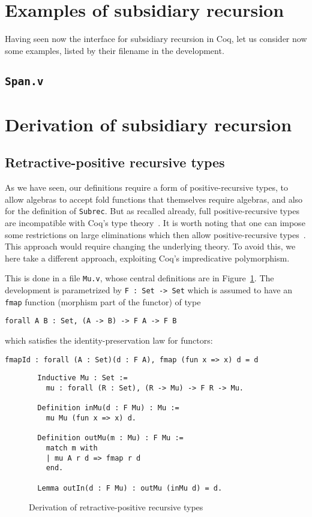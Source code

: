\documentclass[a4paper,USenglish]{lipics-v2021}
\begin{document}
\section{Examples of subsidiary recursion}
\label{sec:examples}

Having seen now the interface for subsidiary recursion in Coq, let us
consider now some examples, listed by their filename in the development.

\subsection{\texttt{Span.v}}



\section{Derivation of subsidiary recursion}
\label{sec:deriv}

\subsection{Retractive-positive recursive types}
\label{sec:mu}

As we have seen, our definitions require a form of positive-recursive
types, to allow algebras to accept fold functions that themselves
require algebras, and also for the definition of \verb|Subrec|.  But
as recalled already, full positive-recursive types are incompatible
with Coq's type theory~\cite{coquand88}.  It is worth noting that one
can impose some restrictions on large eliminations which then allow
positive-recursive types~\cite{blanqui05}.  This approach would
require changing the underlying theory.  To avoid this, we here take a
different approach, exploiting Coq's impredicative polymorphism.

This is done in a file \verb|Mu.v|, whose central definitions are in
Figure~\ref{fig:mu}.  The development is parametrized by
\verb|F : Set -> Set| which is assumed to have an \verb|fmap| function
(morphism part of the functor) of type
\begin{verbatim}
forall A B : Set, (A -> B) -> F A -> F B
\end{verbatim}
\noindent which satisfies the identity-preservation law for functors:
\begin{verbatim}
fmapId : forall (A : Set)(d : F A), fmap (fun x => x) d = d
\end{verbatim}

\begin{figure}
\begin{verbatim}
  Inductive Mu : Set := 
    mu : forall (R : Set), (R -> Mu) -> F R -> Mu.

  Definition inMu(d : F Mu) : Mu :=
    mu Mu (fun x => x) d.

  Definition outMu(m : Mu) : F Mu :=
    match m with
    | mu A r d => fmap r d
    end.

  Lemma outIn(d : F Mu) : outMu (inMu d) = d.
\end{verbatim}
\caption{Derivation of retractive-positive recursive types}
\label{fig:mu}
\end{figure}  
\end{document}
